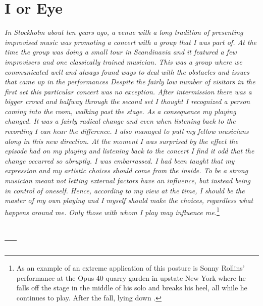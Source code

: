 \documentclass[a4paper]{article}
\begin{document}
\section*{I or Eye}
\label{sec:i-or-eye}

\textit{In Stockholm about ten years ago, a venue with a long tradition of presenting improvised music was promoting a concert with a group that I was part of. At the time the group was doing a small tour in Scandinavia and it featured a few improvisers and one classically trained musician. This was a group where we communicated well and always found ways to deal with the obstacles and issues that came up in the performances Despite the fairly low number of visitors in the first set this particular concert was no exception. After intermission there was a bigger crowd and halfway through the second set I thought I recognized a person coming into the room, walking past the stage. As a consequence my playing changed. It was a fairly radical change and even when listening back to the recording I can hear the difference. I also managed to pull my fellow musicians along in this new direction. At the moment I was surprised by the effect the episode had on my playing and listening back to the concert I find it odd that the change occurred so abruptly. I was embarrassed. I had been taught that my expression and my artistic choices should come from the inside. To be a strong musician meant not letting external factors have an influence, but instead being in control of oneself. Hence, according to my view at the time, I should be the master of my own playing and I myself should make the choices, regardless what happens around me. Only those with whom I play may influence me.}\footnote{As an example of an extreme application of this posture is Sonny Rollins' performance at the Opus 40 quarry garden in upstate New York where he falls off the stage in the middle of his solo and breaks his heel, all while he continues to play. After the fall, lying down \citep{rollins86}.}

\subsection*{---}
\end{document}
